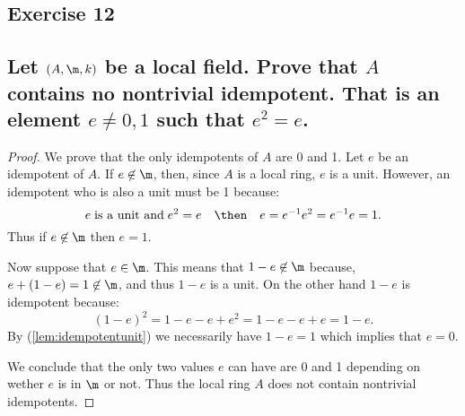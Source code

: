 \subsection*{Exercise 12}
\subsection*{%
Let $(A,\m,k)$ be a local field. Prove that $A$ contains no nontrivial idempotent. That
is an element $e\neq 0,1$ such that $e^2=e$.
} 

\begin{proof}%
We prove that the only idempotents of $A$ are 0 and 1. Let $e$ be an idempotent of $A$.
If $e\not\in\m$, then, since $A$ is a local ring, $e$ is a unit. However, an idempotent
who is also a unit must be 1 because:
\begin{equation}\label{lem:idempotentunit}
	e\;\text{is a unit and}\; e^2=e \quad\then\quad e=e^{-1}e^2=e^{-1}e=1.
\end{equation}
Thus if $e\not\in\m$ then $e=1$.

Now suppose that $e\in\m$. This means that $1-e\not\in\m$ because, $e+(1-e)=1\not\in\m$,
and thus $1-e$ is a unit. On the other hand $1-e$ is idempotent because:
\[
	(1-e)^2=1-e-e+e^2=1-e-e+e=1-e.
\]
By (\ref{lem:idempotentunit}) we necessarily have $1-e=1$ which implies that $e=0$.

We conclude that the only two values $e$ can have are 0 and 1 depending on wether
$e$ is in $\m$ or not. Thus the local ring $A$ does not contain nontrivial idempotents.
%
\end{proof}%

